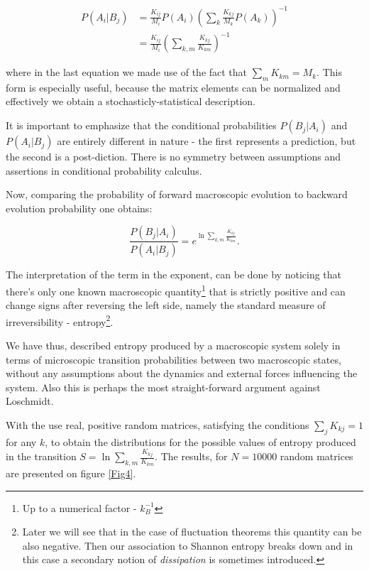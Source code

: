\documentclass[a4paper,12pt]{article}
\begin{document}
\begin{equation}
\begin{aligned}
  P(A_i|B_j) &= \frac{K_{ij}}{M_i} P(A_i) \left( \sum_k \frac{K_{kj}}{M_k}P(A_k) \right)^{-1}\\
  &= \frac{K_{ij}}{M_i} \left( \sum_{k,m} \frac{K_{kj}}{K_{km}} \right)^{-1}
\end{aligned}
\end{equation}

where in the last equation we made use of the fact that $\sum_m K_{km}=M_k $.
This form is especially useful, because the matrix elements can be normalized and effectively we obtain a stochasticly-statistical description.

It is important to emphasize that the conditional probabilities $P(B_j|A_i)$ and $P(A_i|B_j)$ are entirely different in nature - the first represents a prediction, but the second is a post-diction. There is no symmetry between assumptions and assertions in conditional probability calculus.

Now, comparing the probability of forward macroscopic evolution to backward evolution probability one obtains: 

\begin{equation}
\label{MacrostatesPRatio}
  \frac{P(B_j|A_i)}{P(A_i|B_j)}= e^{\ln{\sum_{k,m} \frac{K_{kj}}{K_{km}}}}.
\end{equation}


The interpretation of the term in the exponent, can be done by noticing that there's only one known macroscopic quantity\footnote{Up to a numerical factor - $k_B^{-1}$} that is strictly positive and can change signs after reversing the left side, namely the standard measure of irreversibility - entropy\footnote{Later we will see that in the case of fluctuation theorems this quantity can be also negative. Then our association to Shannon entropy breaks down and in this case a secondary notion of \textit{dissipation} is sometimes introduced.}.

We have thus, described entropy produced by a macroscopic system solely in terms of microscopic transition probabilities between two macroscopic states, without any assumptions about the dynamics and external forces influencing the system. Also this is perhaps the most straight-forward argument against Loschmidt.

With the use real, positive random matrices, satisfying the conditions $\sum_j K_{kj} = 1$ for any $k$, to obtain the distributions for the possible values of entropy produced in the transition $ S = \ln{\sum_{k,m} \frac{K_{kj}}{K_{km}}} $. The results, for $N=10000$ random matrices are presented on figure \ref{Fig4}.
\end{document}
